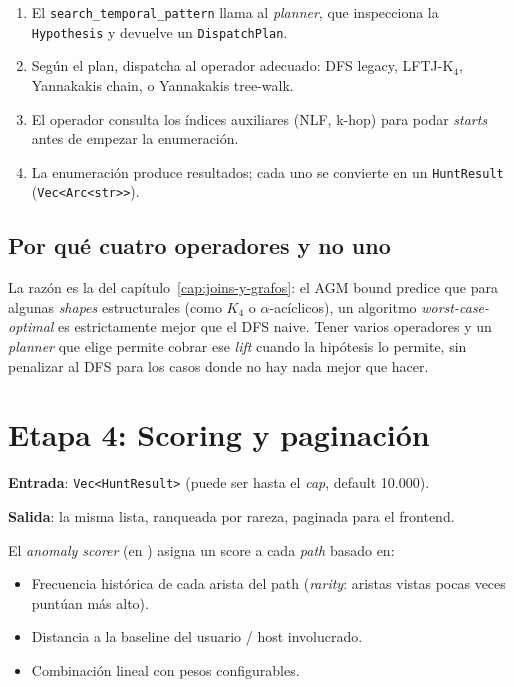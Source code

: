 \begin{enumerate}
    \item El \texttt{search\_temporal\_pattern} llama al
    \emph{planner}, que inspecciona la \texttt{Hypothesis} y devuelve
    un \texttt{DispatchPlan}.
    \item Según el plan, dispatcha al operador adecuado: DFS legacy,
    LFTJ-K\(_4\), Yannakakis chain, o Yannakakis tree-walk.
    \item El operador consulta los índices auxiliares (NLF,
    k-hop) para podar \emph{starts} antes de empezar la enumeración.
    \item La enumeración produce resultados; cada uno se convierte
    en un \texttt{HuntResult} (\texttt{Vec<Arc<str>>}).
\end{enumerate}

\subsection{Por qué cuatro operadores y no uno}

La razón es la del capítulo~\ref{cap:joins-y-grafos}: el AGM bound
predice que para algunas \emph{shapes} estructurales (como \(K_4\) o
\(\alpha\)-acíclicos), un algoritmo \emph{worst-case-optimal} es
estrictamente mejor que el DFS naive. Tener varios operadores y un
\emph{planner} que elige permite cobrar ese \emph{lift} cuando la
hipótesis lo permite, sin penalizar al DFS para los casos donde no
hay nada mejor que hacer.

\section{Etapa 4: Scoring y paginación}

\textbf{Entrada}: \texttt{Vec<HuntResult>} (puede ser hasta el
\emph{cap}, default 10.000).

\textbf{Salida}: la misma lista, ranqueada por rareza, paginada para
el frontend.

El \emph{anomaly scorer} (en )
asigna un score a cada \emph{path} basado en:

\begin{itemize}
    \item Frecuencia histórica de cada arista del path
    (\emph{rarity}: aristas vistas pocas veces puntúan más alto).
    \item Distancia a la baseline del usuario / host involucrado.
    \item Combinación lineal con pesos configurables.
\end{itemize}

